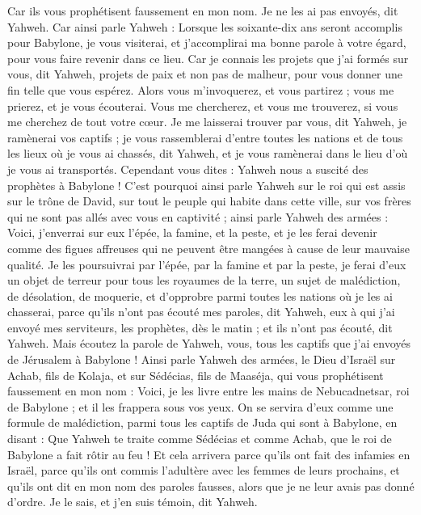 \begin{multicols}{2}
Car ils vous prophétisent faussement en mon nom. Je ne les ai pas envoyés, dit Yahweh.
Car ainsi parle Yahweh : Lorsque les soixante-dix ans seront accomplis pour Babylone, je vous visiterai, et j’accomplirai ma bonne parole à votre égard, pour vous faire revenir dans ce lieu.
Car je connais les projets que j'ai formés sur vous, dit Yahweh, projets de paix et non pas de malheur, pour vous donner une fin telle que vous espérez.
Alors vous m'invoquerez, et vous partirez ; vous me prierez, et je vous écouterai.
Vous me chercherez, et vous me trouverez, si vous me cherchez de tout votre cœur.
Je me laisserai trouver par vous, dit Yahweh, je ramènerai vos captifs ; je vous rassemblerai d'entre toutes les nations et de tous les lieux où je vous ai chassés, dit Yahweh, et je vous ramènerai dans le lieu d’où je vous ai transportés.
Cependant vous dites : Yahweh nous a suscité des prophètes à Babylone !
C'est pourquoi ainsi parle Yahweh sur le roi qui est assis sur le trône de David, sur tout le peuple qui habite dans cette ville, sur vos frères qui ne sont pas allés avec vous en captivité ;
ainsi parle Yahweh des armées : Voici, j’enverrai sur eux l'épée, la famine, et la peste, et je les ferai devenir comme des figues affreuses qui ne peuvent être mangées à cause de leur mauvaise qualité.
Je les poursuivrai par l'épée, par la famine et par la peste, je ferai d’eux un objet de terreur pour tous les royaumes de la terre, un sujet de malédiction, de désolation, de moquerie, et d’opprobre parmi toutes les nations où je les ai chasserai,
parce qu'ils n'ont pas écouté mes paroles, dit Yahweh, eux à qui j’ai envoyé mes serviteurs, les prophètes, dès le matin ; et ils n'ont pas écouté, dit Yahweh.
Mais écoutez la parole de Yahweh, vous, tous les captifs que j'ai envoyés de Jérusalem à Babylone !
Ainsi parle Yahweh des armées, le Dieu d'Israël sur Achab, fils de Kolaja, et sur Sédécias, fils de Maaséja, qui vous prophétisent faussement en mon nom : Voici, je les livre entre les mains de Nebucadnetsar, roi de Babylone ; et il les frappera sous vos yeux.
On se servira d'eux comme une formule de malédiction, parmi tous les captifs de Juda qui sont à Babylone, en disant : Que Yahweh te traite comme Sédécias et comme Achab, que le roi de Babylone a fait rôtir au feu !
Et cela arrivera parce qu'ils ont fait des infamies en Israël, parce qu'ils ont commis l’adultère avec les femmes de leurs prochains, et qu'ils ont dit en mon nom des paroles fausses, alors que je ne leur avais pas donné d’ordre. Je le sais, et j'en suis témoin, dit Yahweh.

\end{multicols}
